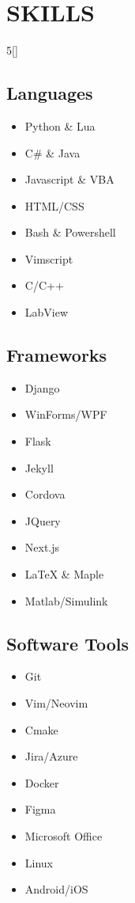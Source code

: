 \section*{SKILLS}

\vspace{-5pt}
\begin{multicols}{5}[\vspace{5pt}]
    \subsection*{Languages}
    \begin{itemize}[]
        \item Python \& Lua
        \item C\# \& Java
        \item Javascript \& VBA
        \item HTML/CSS
        \item Bash \& Powershell
        \item Vimscript
        \item C/C++
        \item LabView
    \end{itemize}

    \subsection*{Frameworks}
    \begin{itemize}
        \item Django
        \item WinForms/WPF
        \item Flask
        \item Jekyll
        \item Cordova
        \item JQuery
        \item Next.js
        \item LaTeX \& Maple
        \item Matlab/Simulink
    \end{itemize}

    \subsection*{Software Tools}
    \begin{itemize}
        \item Git
        \item Vim/Neovim
        \item Cmake
        \item Jira/Azure
        \item Docker
        \item Figma
        \item Microsoft Office
        \item Linux
        \item Android/iOS
    \end{itemize}


\end{multicols}
